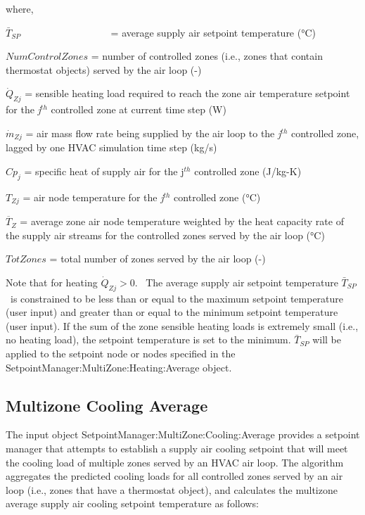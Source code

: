 where,

\({\bar T_{SP}}\) ~~~~~~~~~~~~~~~~~ = average supply air setpoint temperature (°C)

\(NumControlZones\) = number of controlled zones (i.e., zones that contain thermostat objects) served by the air loop (-)

\({\dot Q_{Zj}}\) = sensible heating load required to reach the zone air temperature setpoint for the \emph{j}\(^{th}\) controlled zone at current time step (W)

\({\dot m_{Zj}}\) = air mass flow rate being supplied by the air loop to the \emph{j}\(^{th}\) controlled zone, lagged by one HVAC simulation time step (kg/s)

\(C{p_j}\) = specific heat of supply air for the j\(^{th}\) controlled zone (J/kg-K)

\({T_{Zj}}\) = air node temperature for the \emph{j}\(^{th}\) controlled zone (°C)

\({\overline T_Z}\) = average zone air node temperature weighted by the heat capacity rate of the supply air streams for the controlled zones served by the air loop (°C)

\(TotZones\) = total number of zones served by the air loop (-)

Note that for heating \({\dot Q_{Zj}} > 0.\) ~The average supply air setpoint temperature \({\bar T_{SP}}\) ~is constrained to be less than or equal to the maximum setpoint temperature (user input) and greater than or equal to the minimum setpoint temperature (user input). If the sum of the zone sensible heating loads is extremely small (i.e., no heating load), the setpoint temperature is set to the minimum. \({\bar T_{SP}}\) will be applied to the setpoint node or nodes specified in the SetpointManager:MultiZone:Heating:Average object.

\subsection{Multizone Cooling Average}\label{multizone-cooling-average}

The input object SetpointManager:MultiZone:Cooling:Average provides a setpoint manager that attempts to establish a supply air cooling setpoint that will meet the cooling load of multiple zones served by an HVAC air loop. The algorithm aggregates the predicted cooling loads for all controlled zones served by an air loop (i.e., zones that have a thermostat object), and calculates the multizone average supply air cooling setpoint temperature as follows:

